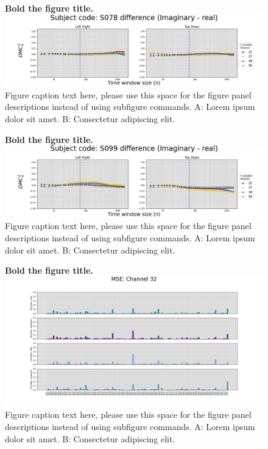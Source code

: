 \documentclass[10pt,letterpaper]{article}
\begin{document}
\begin{figure}[!h]
  \caption{{\bf Bold the figure title.}
  \includegraphics[width=.9\textwidth]{../output/figs/ir_diff/S078.jpg}
  Figure caption text here, please use this space for the figure panel descriptions instead of using subfigure commands. A: Lorem ipsum dolor sit amet. B: Consectetur adipiscing elit.}
  \label{fig:ir_diff_s078}
\end{figure}


\begin{figure}[!h]
  \caption{{\bf Bold the figure title.}
  \includegraphics[width=.9\textwidth]{../output/figs/ir_diff/S099.jpg}
  Figure caption text here, please use this space for the figure panel descriptions instead of using subfigure commands. A: Lorem ipsum dolor sit amet. B: Consectetur adipiscing elit.}
  \label{fig:ir_diff_s099}
\end{figure}


\begin{figure}[!h]
  \caption{{\bf Bold the figure title.}
  \includegraphics[width=.9\textwidth]{../output/figs/mse/mse32.jpg}
  Figure caption text here, please use this space for the figure panel descriptions instead of using subfigure commands. A: Lorem ipsum dolor sit amet. B: Consectetur adipiscing elit.}
  \label{fig:mse32}
\end{figure}
\end{document}
